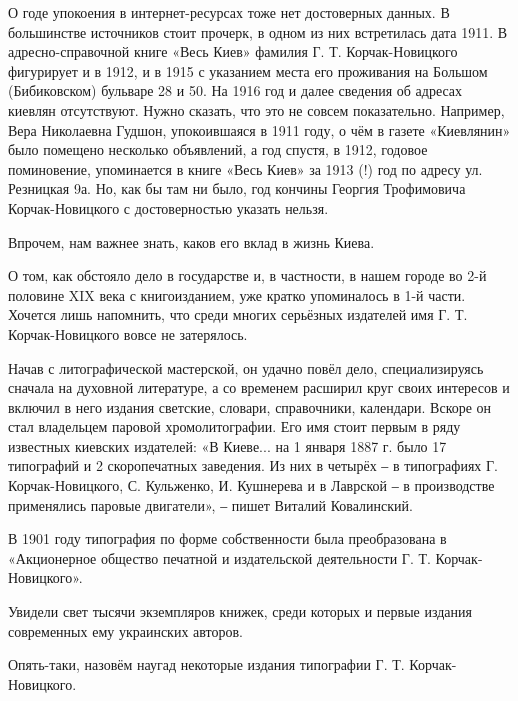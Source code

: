 О годе упокоения в интернет-ресурсах тоже нет достоверных данных. В большинстве
источников стоит прочерк, в одном из них встретилась дата 1911. В
адресно-справочной книге «Весь Киев» фамилия Г. Т. Корчак-Новицкого фигурирует и
в 1912, и в 1915 с указанием места его проживания на Большом (Бибиковском)
бульваре 28 и 50. На 1916 год и далее сведения об адресах киевлян отсутствуют.
Нужно сказать, что это не совсем показательно. Например, Вера Николаевна
Гудшон, упокоившаяся в 1911 году, о чём в газете «Киевлянин» было помещено
несколько объявлений, а год спустя, в 1912, годовое поминовение, упоминается в
книге «Весь Киев» за 1913 (!) год по адресу ул. Резницкая 9а. Но, как бы там ни
было, год кончины Георгия Трофимовича Корчак-Новицкого с достоверностью указать
нельзя.


Впрочем, нам важнее знать, каков его вклад в жизнь Киева. 

О том, как обстояло дело в государстве и, в частности, в нашем городе во 2-й
половине XIX века с книгоизданием, уже кратко упоминалось в 1-й части. Хочется
лишь напомнить, что среди многих серьёзных издателей имя Г. Т. Корчак-Новицкого
вовсе не затерялось. 

Начав с литографической мастерской, он удачно повёл дело, специализируясь
сначала на духовной литературе, а со временем расширил круг своих интересов и
включил в него издания светские, словари, справочники, календари. Вскоре он
стал владельцем паровой хромолитографии. Его имя стоит первым в ряду известных
киевских издателей: «В Киеве... на 1 января 1887 г. было 17 типографий  и 2
скоропечатных заведения. Из них в четырёх ‒ в типографиях Г. Корчак-Новицкого,
С. Кульженко, И. Кушнерева и в Лаврской ‒ в производстве применялись паровые
двигатели», ‒ пишет Виталий Ковалинский.   

В 1901 году типография по форме собственности была преобразована в «Акционерное
общество печатной и издательской деятельности Г. Т. Корчак-Новицкого». 

Увидели свет тысячи экземпляров книжек, среди которых и первые издания
современных ему украинских авторов. 

Опять-таки, назовём наугад некоторые издания типографии Г. Т. Корчак-Новицкого.

